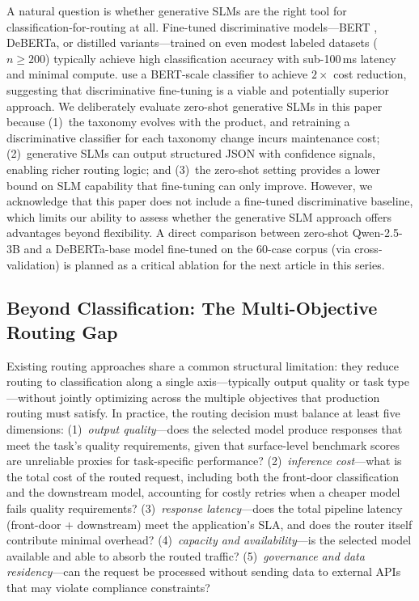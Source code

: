 \documentclass{article}
\begin{document}
A natural question is whether generative SLMs are the right tool for classification-for-routing at all. Fine-tuned discriminative models---BERT \citep{devlin2019bert}, DeBERTa, or distilled variants---trained on even modest labeled datasets ($n \geq 200$) typically achieve high classification accuracy with sub-100\,ms latency and minimal compute. \citet{jiang2023routellm} use a BERT-scale classifier to achieve $2\times$ cost reduction, suggesting that discriminative fine-tuning is a viable and potentially superior approach. We deliberately evaluate zero-shot generative SLMs in this paper because (1)~the taxonomy evolves with the product, and retraining a discriminative classifier for each taxonomy change incurs maintenance cost; (2)~generative SLMs can output structured JSON with confidence signals, enabling richer routing logic; and (3)~the zero-shot setting provides a lower bound on SLM capability that fine-tuning can only improve. However, we acknowledge that this paper does not include a fine-tuned discriminative baseline, which limits our ability to assess whether the generative SLM approach offers advantages beyond flexibility. A direct comparison between zero-shot Qwen-2.5-3B and a DeBERTa-base model fine-tuned on the 60-case corpus (via cross-validation) is planned as a critical ablation for the next article in this series.

\subsection{Beyond Classification: The Multi-Objective Routing Gap}
\label{sec:multi-objective}

Existing routing approaches share a common structural limitation: they reduce routing to classification along a single axis---typically output quality or task type---without jointly optimizing across the multiple objectives that production routing must satisfy. In practice, the routing decision must balance at least five dimensions: (1)~\emph{output quality}---does the selected model produce responses that meet the task's quality requirements, given that surface-level benchmark scores are unreliable proxies for task-specific performance? (2)~\emph{inference cost}---what is the total cost of the routed request, including both the front-door classification and the downstream model, accounting for costly retries when a cheaper model fails quality requirements? (3)~\emph{response latency}---does the total pipeline latency (front-door $+$ downstream) meet the application's SLA, and does the router itself contribute minimal overhead? (4)~\emph{capacity and availability}---is the selected model available and able to absorb the routed traffic? (5)~\emph{governance and data residency}---can the request be processed without sending data to external APIs that may violate compliance constraints?
\end{document}
